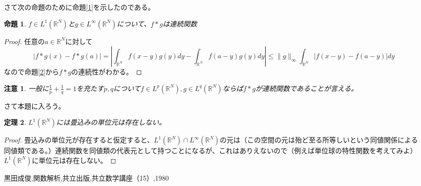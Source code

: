 \documentclass[leqno]{jsarticle}
\newtheorem{thm}{定理}
\newtheorem{prop}[thm]{命題}
\newtheorem*{cau}{注意}
\newcommand{\rr}{\mathbb{R}}
\newcommand{\mgn}{\infty}
\newcommand{\dpst}{\displaystyle}
\begin{document}
さて次の命題のために命題\ref{1}を示したのである。
\begin{prop}
$f\in L^1(\rr^N)$と$g\in L^{\mgn}(\rr^N)$について、$f*g$は連続関数
\end{prop}
\begin{proof}
任意の$a\in \rr^N$に対して
\[
|f*g(x)-f*g(a)|=\left|\int_{\rr^N}f(x-y)g(y)dy-\int_{\rr^N}f(a-y)g(y)dy\right|\le\|g\|_{\mgn}\int_{\rr^N}|f(x-y)-f(a-y)|dy
\]
なので命題\ref{2}から$f*g$の連続性がわかる。
\end{proof}
\begin{cau}
一般に$\dpst \frac{1}{p}+\frac{1}{q}=1$を充たす$p,q$について$f\in L^p(\rr^N),g\in L^q(\rr^N)$ならば$f*g$が連続関数であることが言える。
\end{cau}

さて本題に入ろう。
\begin{thm}
$L^1(\rr^N)$には畳込みの単位元は存在しない。
\end{thm}
\begin{proof}
畳込みの単位元が存在すると仮定すると、$L^1(\rr^N)\cap L^{\mgn}(\rr^N)$の元は（この空間の元は殆ど至る所等しいという同値関係による同値類である。）連続関数を同値類の代表元として持つことになるが、これはありえないので（例えば単位球の特性関数を考えてみよ）$L^1(\rr^N)$に単位元は存在しない。
\end{proof}












































	
\begin{thebibliography}{9}
黒田成俊,関数解析,共立出版,共立数学講座（15）,1980
\end{thebibliography}




			
\end{document}
